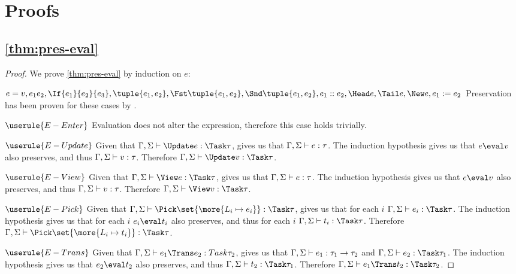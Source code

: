 
\section{Proofs}

\subsection{\cref{thm:pres-eval}}

\begin{proof}
  We prove \cref{thm:pres-eval} by induction on $e$:

  \case
    {$e=v,e_1 e_2,\If{e_1}{e_2}{e_3},\tuple{e_1, e_2},\Fst\tuple{e_1, e_2},\Snd\tuple{e_1, e_2}, e_1 :: e_2, \Head e, \Tail e,\New e, e_1 := e_2$}
    {Preservation has been proven for these cases by \citet{DBLP:books/daglib/0005958}.}


  \case
    {$\userule{E-Enter}$}
    {Evaluation does not alter the expression, therefore this case holds trivially.}

  \case
     {$\userule{E-Update}$}
     {Given that $\Gamma,\Sigma\infers\Update e:\Task \tau$, gives us that $\Gamma,\Sigma\vdash e:\tau$.
     The induction hypothesis gives us that $e\eval v$ also preserves, and thus $\Gamma,\Sigma\vdash v:\tau$.
     Therefore $\Gamma,\Sigma\infers\Update v:\Task\tau$.}



  \case
     {$\userule{E-View}$}
     {Given that $\Gamma,\Sigma\infers \View e:\Task \tau$,  gives us that $\Gamma,\Sigma\vdash e:\tau$.
     The induction hypothesis gives us that $e\eval v$ also preserves, and thus $\Gamma,\Sigma\vdash v:\tau$.
     Therefore $\Gamma,\Sigma\infers\View v:\Task\tau$.}

  \case
    {$\userule{E-Pick}$}
    {Given that $\Gamma,\Sigma\infers \Pick\set{\more{L_i \mapsto e_i}} :\Task \tau$,  gives us that for each $i$ $\Gamma,\Sigma\infers e_i:\Task\tau$.
    The induction hypothesis gives us that for each $i$ $e_i\eval t_i$ also preserves, and thus for each $i$ $\Gamma,\Sigma\infers t_i:\Task\tau$.
    Therefore $\Gamma,\Sigma\infers \Pick\set{\more{L_i \mapsto t_i}} :\Task \tau$.}

  \case
    {$\userule{E-Trans}$}
    {Given that $\Gamma,\Sigma\infers e_1\Trans e_2:Task\tau_2$,  gives us that $\Gamma,\Sigma\vdash e_1:\tau_1\rightarrow\tau_2$ and $\Gamma,\Sigma\infers e_2:\Task \tau_1$.
    The induction hypothesis gives us that $e_2\eval t_2$ also preserves, and thus $\Gamma,\Sigma\infers t_2:\Task\tau_1$.
    Therefore $\Gamma,\Sigma\infers e_1\Trans t_2:\Task\tau_2$.}



\end{proof}
